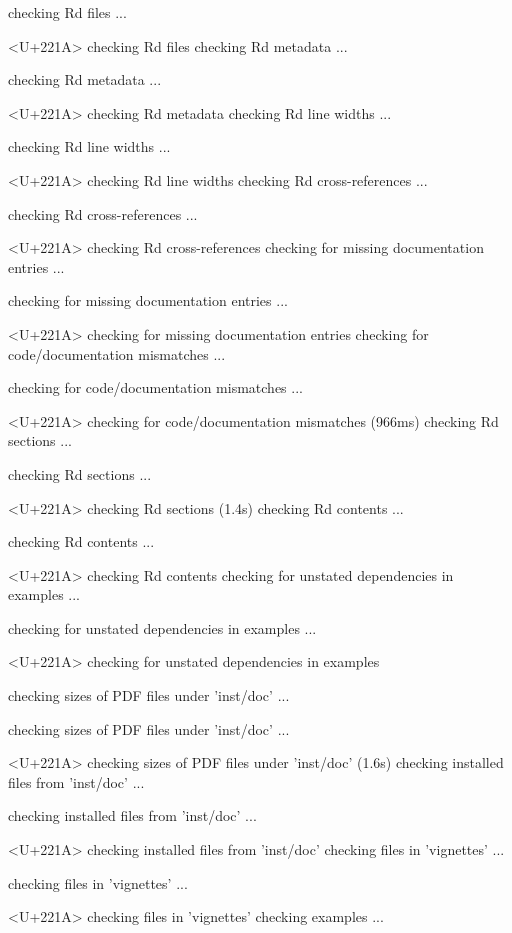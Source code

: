 \documentclass[a4paper,12pt]{article}\usepackage[]{graphicx}\usepackage[]{color}
\begin{document}
\begin{Schunk}
\begin{Soutput}
   checking Rd files ... 
  
<U+221A>  checking Rd files
   checking Rd metadata ...
  
   checking Rd metadata ... 
  
<U+221A>  checking Rd metadata
   checking Rd line widths ...
  
   checking Rd line widths ... 
  
<U+221A>  checking Rd line widths
   checking Rd cross-references ...
  
   checking Rd cross-references ... 
  
<U+221A>  checking Rd cross-references
   checking for missing documentation entries ...
  
   checking for missing documentation entries ... 
  
<U+221A>  checking for missing documentation entries
   checking for code/documentation mismatches ...
  
   checking for code/documentation mismatches ... 
  
<U+221A>  checking for code/documentation mismatches (966ms)
   checking Rd \usage sections ...
  
   checking Rd \usage sections ... 
  
<U+221A>  checking Rd \usage sections (1.4s)
   checking Rd contents ...
  
   checking Rd contents ... 
  
<U+221A>  checking Rd contents
   checking for unstated dependencies in examples ...
  
   checking for unstated dependencies in examples ... 
  
<U+221A>  checking for unstated dependencies in examples

  
  
  
   checking sizes of PDF files under 'inst/doc' ...
  
   checking sizes of PDF files under 'inst/doc' ... 
  
<U+221A>  checking sizes of PDF files under 'inst/doc' (1.6s)
   checking installed files from 'inst/doc' ...
  
   checking installed files from 'inst/doc' ... 
  
<U+221A>  checking installed files from 'inst/doc'
   checking files in 'vignettes' ...
  
   checking files in 'vignettes' ... 
  
<U+221A>  checking files in 'vignettes'
   checking examples ...
  

\end{Soutput}
\end{Schunk}
\end{document}
